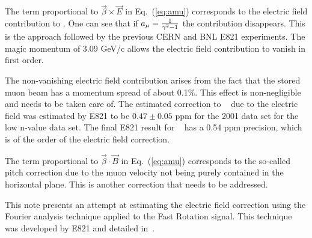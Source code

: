 The term proportional to ${\vec \beta \times \vec E }$ in Eq.~(\ref{eq:amu}) corresponds to the electric field contribution to \wa.
One can see that if $a_{\mu} = {1 \over \gamma^2 - 1}$ the contribution disappears. 
This is the approach followed by the previous CERN and BNL E821 experiments. 
The magic momentum of 3.09 GeV/c allows the electric field contribution to vanish in first order.

The non-vanishing electric field contribution arises from the fact that the stored muon beam has a momentum spread of about 0.1\%.
This effect is non-negligible and needs to be taken care of. The estimated correction to \wa~ due to the electric field was estimated
by E821 to be $0.47 \pm 0.05$ ppm for the 2001 data set for the low n-value data set. The final E821 result for \amu~ has a 0.54 ppm precision, which
is of the order of the electric field correction.

The term proportional to $\vec \beta \cdot \vec B$ in Eq.~(\ref{eq:amu}) corresponds to the so-called pitch correction due to the muon velocity not
being purely contained in the horizontal plane. This is another correction that needs to be addressed.

This note presents an attempt at estimating the electric field correction using the Fourier analysis technique applied to the Fast Rotation signal. 
This technique was developed by E821 and detailed in~\cite{orlov}.
